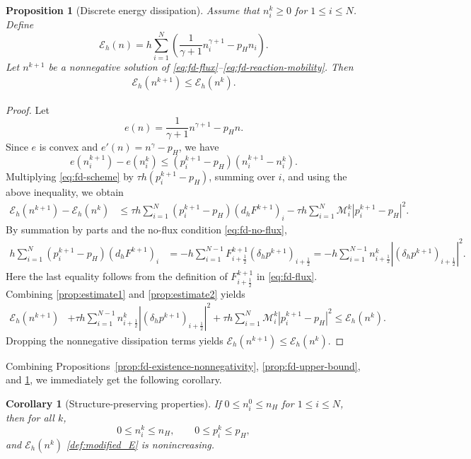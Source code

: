 \documentclass[11pt]{article}
\theoremstyle{plain}
\numberwithin{equation}{section}
\newtheorem{proposition}{Proposition}[section]
\newtheorem{corollary}{Corollary}[section]
\begin{document}
\begin{proposition}[Discrete energy dissipation]
\label{prop:fd-energy-dissipation}
Assume that \(n_i^k\ge0\) for \(1\le i\le N\). Define
\begin{equation}\label{def:modified_E}
\mathcal E_h(n)
=
h\sum_{i=1}^N
\left(
\frac{1}{\gamma+1}n_i^{\gamma+1}
-
p_Hn_i
\right).
\end{equation}
Let \(n^{k+1}\) be a nonnegative solution of
\eqref{eq:fd-flux}--\eqref{eq:fd-reaction-mobility}. Then
\begin{align}
\mathcal E_h(n^{k+1})
\le
\mathcal E_h(n^k).
\label{eq:fd-energy-dissipation}
\end{align}
\end{proposition}

\begin{proof}
Let
\[
    e(n)=\frac{1}{\gamma+1}n^{\gamma+1}-p_Hn .
\]
Since \(e\) is convex and \(e'(n)=n^\gamma-p_H\), we have
\[
    e(n_i^{k+1})-e(n_i^k)
    \le
    (p_i^{k+1}-p_H)(n_i^{k+1}-n_i^k).
\]
Multiplying \eqref{eq:fd-scheme} by
\(\tau h(p_i^{k+1}-p_H)\), summing over \(i\), and using the above
inequality, we obtain
\begin{align}
\mathcal E_h(n^{k+1})-\mathcal E_h(n^k)
&\le
\tau h
\sum_{i=1}^N
(p_i^{k+1}-p_H)(d_hF^{k+1})_i  
-
\tau h
\sum_{i=1}^N
\mathcal M_i^k|p_i^{k+1}-p_H|^2 . \label{prop:estimate1}
\end{align}
By summation by parts and the no-flux condition \eqref{eq:fd-no-flux},
\begin{align}
h\sum_{i=1}^N
(p_i^{k+1}-p_H)(d_hF^{k+1})_i
&=
-h\sum_{i=1}^{N-1}
F_{i+\frac12}^{k+1}
(\delta_hp^{k+1})_{i+\frac12} = 
-h\sum_{i=1}^{N-1}
n_{i+\frac12}^k
\left|
(\delta_hp^{k+1})_{i+\frac12}
\right|^2 . \label{prop:estimate2}
\end{align}
Here the last equality follows from the definition of \(F_{i+\frac12}^{k+1}\)
in \eqref{eq:fd-flux}.
Combining \eqref{prop:estimate1} and \eqref{prop:estimate2} yields
\begin{align}
\mathcal E_h(n^{k+1})
&+
\tau h
\sum_{i=1}^{N-1}
n_{i+\frac12}^k
\left|
(\delta_hp^{k+1})_{i+\frac12}
\right|^2
+
\tau h
\sum_{i=1}^N
\mathcal M_i^k
\left|
p_i^{k+1}-p_H
\right|^2
\le
\mathcal E_h(n^k).
\end{align}
Dropping the nonnegative
dissipation terms yields \(\mathcal E_h(n^{k+1})\le \mathcal E_h(n^{k})\).
\end{proof}


Combining Propositions~\ref{prop:fd-existence-nonnegativity},
\ref{prop:fd-upper-bound}, and \ref{prop:fd-energy-dissipation}, we immediately get the following corollary. 
\begin{corollary}[Structure-preserving properties]
\label{cor:fd-structure-preserving}
If \(0\le n_i^0\le n_H\) for \(1\le i\le N\), then for all \(k\),
\[
0\le n_i^k\le n_H,\qquad 0\le p_i^k\le p_H,
\]
and \(\mathcal E_h(n^k)\) \eqref{def:modified_E} is nonincreasing.
\end{corollary}
\end{document}
